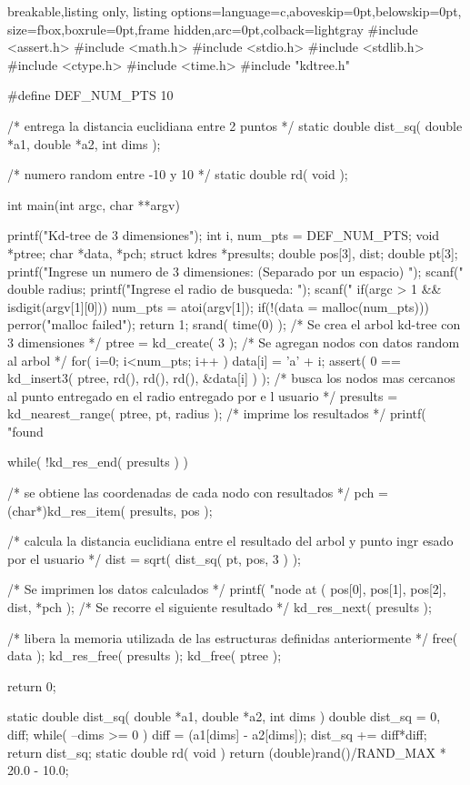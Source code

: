 \documentclass[12pt]{article}
\begin{document}
\begin{tcblisting}{breakable,listing only,
  listing options={language=c,aboveskip=0pt,belowskip=0pt},
  size=fbox,boxrule=0pt,frame hidden,arc=0pt,colback=lightgray}
#include <assert.h>
#include <math.h>
#include <stdio.h>
#include <stdlib.h>
#include <ctype.h>
#include <time.h>
#include "kdtree.h"

#define DEF_NUM_PTS 10

/* entrega la distancia euclidiana entre 2 puntos */
static double dist_sq( double *a1, double *a2, int dims );

/* numero random entre -10 y 10 */
static double rd( void );

int main(int argc, char **argv) {
  printf("Kd-tree de 3 dimensiones\n");
  int i, num_pts = DEF_NUM_PTS;
  void *ptree;
  char *data, *pch;
  struct kdres *presults;
  double pos[3], dist;
  double pt[3];
  printf("Ingrese un numero de 3 dimensiones: (Separado por un espacio) ");
  scanf("%
  double radius;
  printf("Ingrese el radio de busqueda: ");
  scanf("%
  if(argc > 1 && isdigit(argv[1][0])) {
    num_pts = atoi(argv[1]);
  }
  if(!(data = malloc(num_pts))) {
    perror("malloc failed");
    return 1;
  }
  srand( time(0) );
  /* Se crea el arbol kd-tree con 3 dimensiones */
  ptree = kd_create( 3 );
  /* Se agregan nodos con datos random al arbol */
  for( i=0; i<num_pts; i++ ) {
    data[i] = 'a' + i;
    assert( 0 == kd_insert3( ptree, rd(), rd(), rd(), &data[i] ) );
  }
  /* busca los nodos mas cercanos al punto entregado en el radio entregado por e                                                                                                                            l usuario */
  presults = kd_nearest_range( ptree, pt, radius );
  /* imprime los resultados */
  printf( "found %

  while( !kd_res_end( presults ) ) {
    /* se obtiene las coordenadas de cada nodo con resultados */
    pch = (char*)kd_res_item( presults, pos );

    /* calcula la distancia euclidiana entre el resultado del arbol y punto ingr                                                                                                                            esado por el usuario */
    dist = sqrt( dist_sq( pt, pos, 3 ) );

    /* Se imprimen los datos calculados */
    printf( "node at (%
            pos[0], pos[1], pos[2], dist, *pch );
    /* Se recorre el siguiente resultado */
    kd_res_next( presults );
  }
  /* libera la memoria utilizada de las estructuras definidas anteriormente */
  free( data );
  kd_res_free( presults );
  kd_free( ptree );

  return 0;
}
static double dist_sq( double *a1, double *a2, int dims ) {
  double dist_sq = 0, diff;
  while( --dims >= 0 ) {
    diff = (a1[dims] - a2[dims]);
    dist_sq += diff*diff;
  }
  return dist_sq;
}
static double rd( void ) {
  return (double)rand()/RAND_MAX * 20.0 - 10.0;
}
\end{tcblisting}
\end{document}
